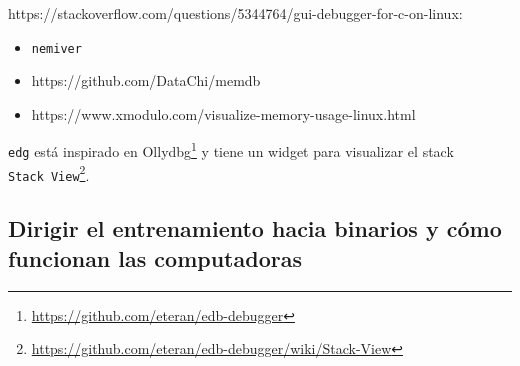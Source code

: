 \documentclass[
  12,
]{scrartcl}
\DeclareRobustCommand{\href}[2]{#2\footnote{\url{#1}}}
\begin{document}
https://stackoverflow.com/questions/5344764/gui-debugger-for-c-on-linux:

\begin{itemize}
\item
  \texttt{nemiver}
\item
  https://github.com/DataChi/memdb
\item
  https://www.xmodulo.com/visualize-memory-usage-linux.html
\end{itemize}

\href{https://github.com/eteran/edb-debugger}{\texttt{edg} está
inspirado en Ollydbg} y tiene
\href{https://github.com/eteran/edb-debugger/wiki/Stack-View}{un widget
para visualizar el stack \texttt{Stack\ View}}.

\hypertarget{dirigir-el-entrenamiento-hacia-binarios-y-cuxf3mo-funcionan-las-computadoras}{%
\subsection{Dirigir el entrenamiento hacia binarios y cómo funcionan las
computadoras}\label{dirigir-el-entrenamiento-hacia-binarios-y-cuxf3mo-funcionan-las-computadoras}}
\end{document}
